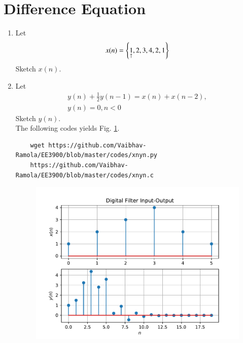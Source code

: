 \documentclass[journal,12pt,twocolumn]{IEEEtran}
\renewcommand\thesection{\arabic{section}}
\begin{document}
\section{Difference Equation}
\begin{enumerate}[label=\thesection.\arabic*,ref=\thesection.\theenumi]
\item Let
\label{prob:xn}
\begin{equation}
	x(n) = \left\{\underset{\uparrow}{1},2,3,4,2,1\right\}
\end{equation}
Sketch $x(n)$.
\item Let
\begin{multline}
	\label{eq:iir_filter}
	y(n) + \frac{1}{2}y(n-1) = x(n) + x(n-2), 
	\\
	y(n) = 0, n < 0
\end{multline}
Sketch $y(n)$.
\\
\solution The following codes yields Fig. \ref{fig:xnyn}.
\begin{lstlisting}
	wget https://github.com/Vaibhav-Ramola/EE3900/blob/master/codes/xnyn.py
	https://github.com/Vaibhav-Ramola/EE3900/blob/master/codes/xnyn.c
\end{lstlisting}
\begin{figure}[!ht]
	\begin{center}
		\includegraphics[width=\columnwidth]{./figs/xnyn}
	\end{center}
	\label{fig:xnyn}	
\end{figure}

\end{enumerate}
\end{document}
